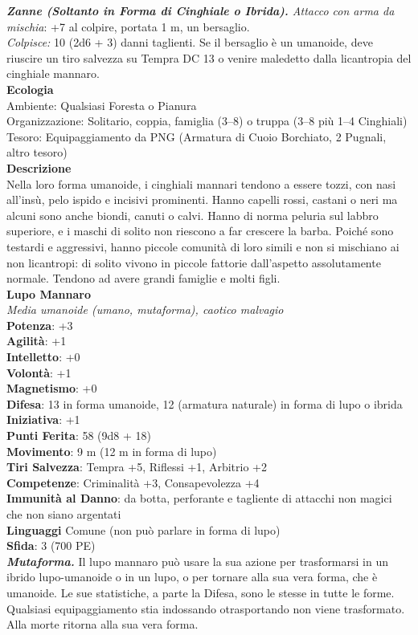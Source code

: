 \begin{multicols}{2}
\emph{\textbf{Zanne (Soltanto in Forma di Cinghiale o Ibrida).} Attacco con arma da mischia}: +7 al colpire, portata 1 m, un bersaglio.\\
\emph{Colpisce:} 10 (2d6 + 3) danni taglienti. Se il bersaglio è un umanoide, deve riuscire un tiro salvezza su Tempra DC  13 o venire maledetto dalla licantropia del cinghiale mannaro.\\
\textbf{Ecologia}\\
Ambiente: Qualsiasi Foresta o Pianura\\
Organizzazione: Solitario, coppia, famiglia (3–8) o truppa (3–8 più 1–4 Cinghiali)\\
Tesoro: Equipaggiamento da PNG (Armatura di Cuoio Borchiato, 2 Pugnali, altro tesoro)\\
\textbf{Descrizione}\\
Nella loro forma umanoide, i cinghiali mannari tendono a essere tozzi, con nasi all'insù, pelo ispido e incisivi prominenti. Hanno capelli rossi, castani o neri ma alcuni sono anche biondi, canuti o calvi. Hanno di norma peluria sul labbro superiore, e i maschi di solito non riescono a far crescere la barba. Poiché sono testardi e aggressivi, hanno piccole comunità di loro simili e non si mischiano ai non licantropi: di solito vivono in piccole fattorie dall’aspetto assolutamente normale. Tendono ad avere grandi famiglie e molti figli.\\

\medskip\textbf{Lupo Mannaro}\\
\emph{Media umanoide (umano, mutaforma), caotico malvagio}\\
\textbf{Potenza}: +3\\
\textbf{Agilità}: +1\\
\textbf{Intelletto}: +0\\
\textbf{Volontà}: +1\\
\textbf{Magnetismo}: +0\\
\textbf{Difesa}: 13 in forma umanoide, 12 (armatura naturale) in forma di lupo o ibrida \\ \textbf{Iniziativa}: +1\\
\textbf{Punti Ferita}: 58 (9d8 + 18)\\
\textbf{Movimento}: 9 m (12 m in forma di lupo)\\
\textbf{Tiri Salvezza}: Tempra +5, Riflessi +1, Arbitrio +2\\
\textbf{Competenze}: Criminalità +3, Consapevolezza +4\\
\textbf{Immunità al Danno}: da botta, perforante e tagliente di attacchi non magici che non siano argentati\\
\textbf{Linguaggi} Comune (non può parlare in forma di lupo)\\
\textbf{Sfida}: 3 (700 PE)\smallskip\\
\emph{\textbf{Mutaforma.}} Il lupo mannaro può usare la sua azione per trasformarsi in un ibrido lupo-umanoide o in un lupo, o per tornare alla sua vera forma, che è umanoide. Le sue statistiche, a parte la Difesa, sono le stesse in tutte le forme. Qualsiasi equipaggiamento stia indossando otrasportando non viene trasformato. Alla morte ritorna alla sua vera  forma.\\


\end{multicols}
